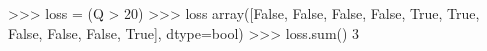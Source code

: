 
>>> loss = (Q > 20)
>>> loss
array([False, False, False, False,  True,  True, False, False, False,
True], dtype=bool)
>>> loss.sum()
3

